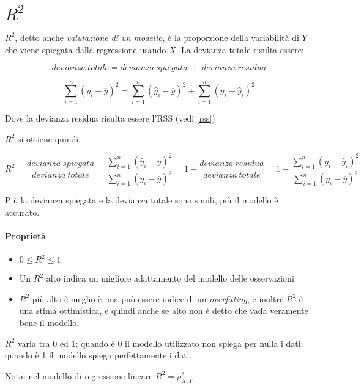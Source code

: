 \section{$R^2$}

$R^2$, detto anche \textit{valutazione di un modello}, \`e la proporzione della 
variabilit\`a di $Y$ che viene spiegata dalla regressione usando $X$.
La devianza totale risulta essere:

\[ devianza\ totale = devianza\ spiegata\ +\ devianza\ residua\]

\[ \sum_{i=1}^n (y_i - \overline{y})^2 = \sum_{i=1}^n (\hat{y}_i - 
\overline{y})^2 + \sum_{i=1}^n (y_i - \hat{y}_i)^2 \]

Dove la devianza residua risulta essere l'RSS (vedi \ref{rss})

$R^2$ si ottiene quindi:

\[ R^2 = \frac{devianza\ spiegata}{devianza\ totale} = \frac{\sum_{i=1}^n 
(\hat{y}_i - \overline{y})^2}{\sum_{i=1}^n (y_i - \overline{y})^2} = 1 - 
\frac{devianza\ residua}{devianza\ totale} = 1 - \frac{\sum_{i=1}^n (y_i - 
\hat{y}_i)^2}{\sum_{i=1}^n (y_i - \overline{y})^2} \]

Più la devianza spiegata e la devianza totale sono simili, più il modello è
accurato.

\paragraph*{Propriet\`a}
\begin{itemize}
 \item $0 \le R^2 \le 1$
 \item Un $R^2$ alto indica un migliore adattamento del modello delle 
osservazioni
 \item $R^2$ pi\`u alto \`e meglio \`e, ma pu\`o essere indice di un
\textit{overfitting}, e inoltre $R^2$ \`e una stima ottimistica, e quindi anche 
se alto non \`e detto che vada veramente bene il modello.
\end{itemize}

$R^2$ varia tra 0 ed 1: quando è 0 il modello utilizzato non spiega per
nulla i dati; quando è 1 il modello spiega perfettamente i dati.

Nota: nel modello di regressione lineare $R^2 = \rho_{X,Y}^2$

